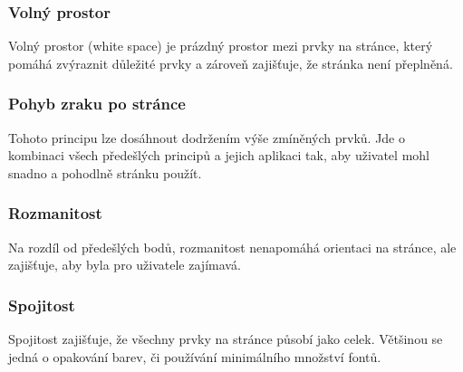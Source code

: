 \subsubsection*{Volný prostor}
Volný prostor (white space) je prázdný prostor mezi prvky na stránce, který pomáhá zvýraznit důležité prvky a zároveň zajišťuje, že stránka není přeplněná.

\subsubsection*{Pohyb zraku po stránce}
Tohoto principu lze dosáhnout dodržením výše zmíněných prvků. Jde o kombinaci všech předešlých principů a jejich aplikaci tak, aby uživatel mohl snadno a pohodlně stránku použít.

\subsubsection*{Rozmanitost}
Na rozdíl od předešlých bodů, rozmanitost nenapomáhá orientaci na stránce, ale zajišťuje, aby byla pro uživatele zajímavá.

\subsubsection*{Spojitost}
Spojitost zajišťuje, že všechny prvky na stránce působí jako celek. Většinou se jedná o opakování barev, či používání minimálního množství fontů.


